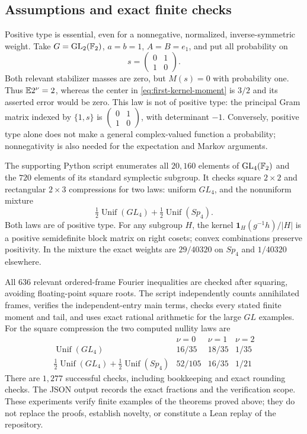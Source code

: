 \subsection{Assumptions and exact finite checks}

Positive type is essential, even for a nonnegative, normalized,
inverse-symmetric weight. Take $G=\operatorname{GL}_2(\mathbb F_2)$, $a=b=1$,
$A=B=e_1$, and put all probability on
\[
 s=\begin{pmatrix}0&1\\1&0\end{pmatrix}.
\]
Both relevant stabilizer masses are zero, but $M(s)=0$ with probability
one. Thus $\mathbb E 2^\nu=2$, whereas the center in
\eqref{eq:first-kernel-moment} is $3/2$ and its asserted error would be
zero. This law is not of positive type: the principal Gram matrix indexed
by $\{1,s\}$ is $\left(\begin{smallmatrix}0&1\\1&0\end{smallmatrix}\right)$,
with determinant $-1$. Conversely, positive type alone does not make a
general complex-valued function a probability; nonnegativity is also needed
for the expectation and Markov arguments.

The supporting Python script enumerates all $20{,}160$ elements of
$\operatorname{GL}_4(\mathbb F_2)$ and the $720$ elements of its standard symplectic
subgroup. It checks square $2\times2$ and rectangular $2\times3$
compressions for two laws: uniform $GL_4$, and the nonuniform mixture
\[
 \tfrac12\operatorname{Unif}(GL_4)
 +\tfrac12\operatorname{Unif}(Sp_4).
\]
Both laws are of positive type. For any subgroup $H$, the kernel
$\boldsymbol{1}_H(g^{-1}h)/|H|$ is a positive semidefinite block matrix on
right cosets; convex combinations preserve positivity. In the mixture the
exact weights are $29/40320$ on $Sp_4$ and $1/40320$ elsewhere.

All $636$ relevant ordered-frame Fourier inequalities are checked after
squaring, avoiding floating-point square roots. The script independently
counts annihilated frames, verifies the independent-entry main terms, checks
every stated finite moment and tail, and uses exact rational arithmetic for
the large $GL$ examples. For the square compression the two computed
nullity laws are
\[
\begin{array}{c|ccc}
 &\nu=0&\nu=1&\nu=2\\ \hline
 \operatorname{Unif}(GL_4)&16/35&18/35&1/35\\
 \tfrac12\operatorname{Unif}(GL_4)+
 \tfrac12\operatorname{Unif}(Sp_4)&52/105&16/35&1/21
\end{array}
\]
There are $1{,}277$ successful checks, including bookkeeping and exact
rounding checks. The JSON output records the exact fractions and the
verification scope. These experiments verify finite examples of the
theorems proved above; they do not replace the proofs, establish novelty,
or constitute a Lean replay of the repository.

